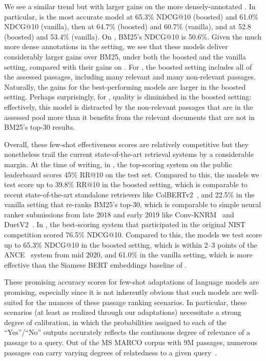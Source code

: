 We see a similar trend but with larger gains on the more densely-annotated \msmarcotrec. In particular, \instructdavinci is the most accurate model at 65.3\% NDCG@10 (boosted) and 61.0\% NDCG@10 (vanilla), then \mtnlgfivethreezero at 64.7\% (boosted) and 60.7\% (vanilla), and \coherexl at 52.8 (boosted) and 53.4\% (vanilla). On \msmarcotrec, BM25's NDCG@10 is 50.6\%. Given the much more dense annotations in the \msmarcotrec setting, we see that these models deliver considerably larger gains over BM25, under both the boosted and the vanilla setting, compared with their gains on \msmarcoregular. For \msmarcotrec, the boosted setting includes all of the assessed passages, including many relevant and many non-relevant passages. Naturally, the gains for the best-performing models are larger in the boosted setting. Perhaps surprisingly, for \coherexl, quality is diminished in the boosted setting: effectively, this model is distracted by the non-relevant passages that are in the assessed pool more than it benefits from the relevant documents that are not in BM25's top-30 results.

Overall, these few-shot effectiveness scores are relatively competitive but they nonetheless trail the current state-of-the-art retrieval systems by a considerable margin. At the time of writing, in \msmarcoregular, the top-scoring system on the public leaderboard scores 45\% RR@10 on the test set. Compared to this, the models we test score up to 39.8\% RR@10 in the boosted setting, which is comparable to recent state-of-the-art standalone retrievers like ColBERTv2~\citep{santhanam2021colbertv2}, and 22.5\% in the vanilla setting that re-ranks BM25's top-30, which is comparable to simple neural ranker submissions from late 2018 and early 2019 like Conv-KNRM~\citep{dai2018convolutional} and DuetV2~\citep{mitra2019updated}. In \msmarcotrec, the best-scoring system that participated in the original NIST competition scored 76.5\% NDCG@10. Compared to this, the models we test score up to 65.3\% NDCG@10 in the boosted setting, which is within 2--3 points of the ANCE~\citep{xiong2020approximate} system from mid 2020, and 61.0\% in the vanilla setting, which is more effective than the Siamese BERT embeddings baseline of \citet{gao2021complement}.

These promising accuracy scores for few-shot adaptations of language models are promising, especially since it is not inherently obvious that such models are well-suited for the nuances of these passage ranking scenarios. In particular, these scenarios (at least as realized through our adaptations) necessitate a strong degree of calibration, in which the probabilities assigned to each of the ``Yes''/``No'' outputs accurately reflects the continuous degree of relevance of a passage to a query. Out of the MS MARCO corpus with 9M passages, numerous passages can carry varying degrees of relatedness to a given query~\citep{craswell2020overview}.

